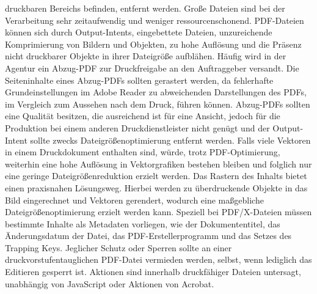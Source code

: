 druckbaren Bereichs befinden, entfernt werden. Große Dateien sind bei der Verarbeitung sehr zeitaufwendig und weniger ressourcenschonend. PDF-Dateien können sich durch Output-Intents, eingebettete Dateien, unzureichende Komprimierung von Bildern und Objekten, zu hohe Auflösung und die Präsenz nicht druckbarer Objekte in ihrer Dateigröße aufblähen. Häufig wird in der Agentur ein Abzug-PDF zur Druckfreigabe an den Auftraggeber versandt. Die Seiteninhalte eines Abzug-PDFs sollten gerastert werden, da fehlerhafte Grundeinstellungen im Adobe Reader zu abweichenden Darstellungen des PDFs, im Vergleich zum Aussehen nach dem Druck, führen können. Abzug-PDFs sollten eine Qualität besitzen, die ausreichend ist für eine Ansicht, jedoch für die Produktion bei einem anderen Druckdienstleister nicht genügt und der Output-Intent sollte zwecks Dateigrößenoptimierung entfernt werden. Falls viele Vektoren in einem Druckdokument enthalten sind, würde, trotz PDF-Optimierung, weiterhin eine hohe Auflösung in Vektorgrafiken bestehen bleiben und folglich nur eine geringe Dateigrößenreduktion erzielt werden. Das Rastern des Inhalts bietet einen praxisnahen Lösungsweg. Hierbei werden zu überdruckende Objekte in das Bild eingerechnet und Vektoren gerendert, wodurch eine maßgebliche Dateigrößenoptimierung erzielt werden kann. Speziell bei PDF/X-Dateien müssen bestimmte Inhalte als Metadaten vorliegen, wie der Dokumententitel, das Änderungsdatum der Datei, das PDF-Erstellerprogramm und das Setzes des Trapping Keys. Jeglicher Schutz oder Sperren sollte an einer druckvorstufentauglichen PDF-Datei vermieden werden, selbst, wenn lediglich das Editieren gesperrt ist. Aktionen sind innerhalb druckfähiger Dateien untersagt, unabhängig von JavaScript oder Aktionen von Acrobat. \\
